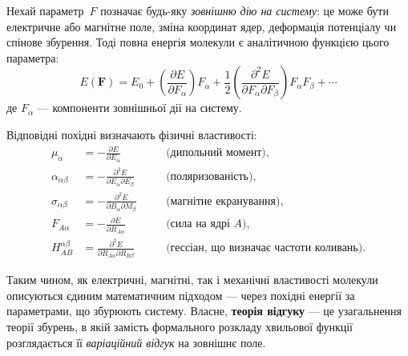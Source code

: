 Нехай параметр~$F$ позначає будь-яку \emph{зовнішню дію на систему}:
це може бути електричне або магнітне поле, зміна координат ядер, деформація потенціалу чи спінове збурення.
Тоді повна енергія молекули є аналітичною функцією цього параметра:
\[
E(\mathbf{F}) = E_0
+ \left( \frac{\partial E}{\partial F_\alpha} \right) F_\alpha
+ \frac{1}{2} \left( \frac{\partial^2 E}{\partial F_\alpha \partial F_\beta} \right) F_\alpha F_\beta
+ \cdots
\]
де $F_\alpha$ --- компоненти зовнішньої дії  на систему.

Відповідні похідні визначають фізичні властивості:
\[
\begin{aligned}
\mu_\alpha &= - \frac{\partial E}{\partial E_\alpha}
\quad &&\text{(дипольний момент)},\\[3pt]
\alpha_{\alpha\beta} &= - \frac{\partial^2 E}{\partial E_\alpha \partial E_\beta}
\quad &&\text{(поляризованість)},\\[3pt]
\sigma_{\alpha\beta} &= - \frac{\partial^2 E}{\partial B_\alpha \partial M_\beta}
\quad &&\text{(магнітне екранування)},\\[3pt]
F_{A\alpha} &= - \frac{\partial E}{\partial R_{A\alpha}}
\quad &&\text{(сила на ядрі~$A$)},\\[3pt]
H_{AB}^{\alpha\beta} &= \frac{\partial^2 E}{\partial R_{A\alpha}\partial R_{B\beta}}
\quad &&\text{(гессіан, що визначає частоти коливань)}.
\end{aligned}
\]

Таким чином, як електричні, магнітні, так і механічні властивості молекули
описуються єдиним математичним підходом — через похідні енергії за параметрами, що збурюють систему.
Власне, \textbf{теорія відгуку} --- це узагальнення теорії збурень, в якій
замість формального розкладу хвильової функції розглядається її \emph{варіаційний відгук} на зовнішнє поле.


